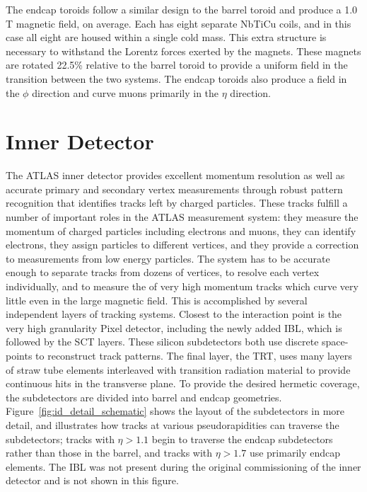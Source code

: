 The endcap toroids follow a similar design to the barrel toroid and produce a 1.0 T magnetic field, on average. 
Each has eight separate NbTiCu coils, and in this case all eight are housed within a single cold mass.
This extra structure is necessary to withstand the Lorentz forces exerted by the magnets. 
These magnets are rotated 22.5\% relative to the barrel toroid to provide a uniform field in the transition between the two systems. 
The endcap toroids also produce a field in the $\phi$ direction and curve muons primarily in the $\eta$ direction.


\section{Inner Detector}
\label{sec:inner_detector}

The ATLAS inner detector provides excellent momentum resolution as well as accurate primary and secondary vertex measurements through robust pattern recognition that identifies tracks left by charged particles. 
These tracks fulfill a number of important roles in the ATLAS measurement system: they measure the momentum of charged particles including electrons and muons, they can identify electrons, they assign particles to different vertices, and they provide a correction to \met measurements from low energy particles. 
The system has to be accurate enough to separate tracks from dozens of vertices, to resolve each vertex individually, and to measure the \pt of very high momentum tracks which curve very little even in the large magnetic field.
This is accomplished by several independent layers of tracking systems.
Closest to the interaction point is the very high granularity Pixel detector, including the newly added \ac{IBL}, which is followed by the \ac{SCT} layers.
These silicon subdetectors both use discrete space-points to reconstruct track patterns.
The final layer, the \ac{TRT}, uses many layers of straw tube elements interleaved with transition radiation material to provide continuous hits in the transverse plane.
To provide the desired hermetic coverage, the subdetectors are divided into barrel and endcap geometries.
Figure~\ref{fig:id_detail_schematic} shows the layout of the subdetectors in more detail, and illustrates how tracks at various pseudorapidities can traverse the subdetectors; tracks with $\eta > 1.1$ begin to traverse the endcap subdetectors rather than those in the barrel, and tracks with $\eta > 1.7$ use primarily endcap elements. 
The \ac{IBL} was not present during the original commissioning of the inner detector and is not shown in this figure.

